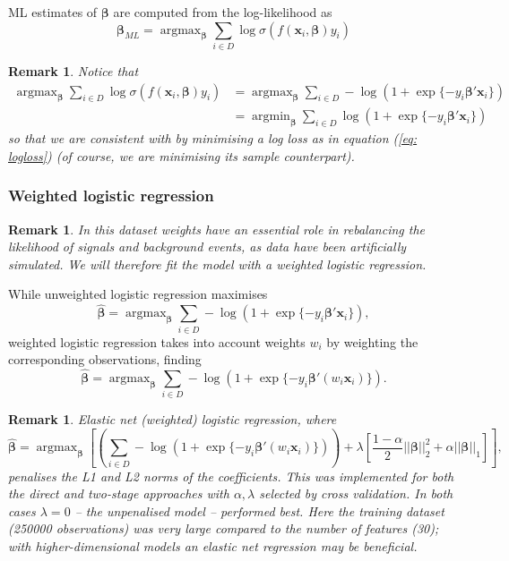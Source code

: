 \documentclass[]{article}
\DeclareMathOperator*{\argmin}{argmin}
\DeclareMathOperator*{\argmax}{argmax}
\newcommand{\x}{\mathbf{x}}
\newcommand{\bbeta}{\boldsymbol \beta}
\newtheorem{remark}[theorem]{Remark}
\begin{document}
ML estimates of $\bbeta$ are computed from the log-likelihood as $$\bbeta_{ML}=\argmax_{\bbeta}\sum_{i\in D}\log\sigma(f(\x_i,\bbeta)y_i)$$

\begin{remark}
Notice that 
\begin{align*}
\argmax_{\bbeta}\sum_{i\in D}\log\sigma(f(\x_i,\bbeta)y_i)&=\argmax_{\bbeta}\sum_{i\in D}-\log(1+\exp\{-y_i\bbeta'\x_i \}) \\
&=\argmin_{\bbeta}\sum_{i\in D}\log(1+\exp\{- y_i\bbeta'\x_i\})
\end{align*} so that we are consistent with \cite{kotlowski2014consistent} by minimising a log loss as in equation (\ref{eq: logloss}) (of course, we are minimising its sample counterpart).
\end{remark}
\subsubsection{Weighted logistic regression}
\begin{remark}
In this dataset weights have an essential role in rebalancing the likelihood of signals and background events, as data have been artificially simulated. We will therefore fit the model with a weighted logistic regression.
\end{remark}

\noindent While unweighted logistic regression maximises 
$$\hat{\bbeta}=\argmax_{\bbeta}\sum_{i\in D}-\log(1+\exp\{-y_i\bbeta'\x_i \}),$$
weighted logistic regression takes into account weights $w_i$ by weighting the corresponding observations, finding
\begin{equation}
\hat{\bbeta}=\argmax_{\bbeta}\sum_{i\in D}-\log(1+\exp\{- y_i\bbeta'(w_i\x_i) \}).
\end{equation}

\begin{remark}
Elastic net (weighted) logistic regression, where
$$\hat{\bbeta}= \argmax_{\bbeta}\left[ \left( \sum_{i\in D}-\log(1+\exp\{- y_i\bbeta'(w_i\x_i) \})\right)  + \lambda\left[ \frac{1-\alpha}{2}||\bbeta||^2_2 + \alpha||\bbeta||_1 \right] \right], 
$$
penalises the L1 and L2 norms of the coefficients. This was implemented for both the direct and two-stage approaches with $\alpha, \lambda$ selected by cross validation. In both cases $\lambda=0$ -- the unpenalised model -- performed best. Here the training dataset (250000 observations) was very large compared to the number of features (30); with higher-dimensional models an elastic net regression may be beneficial.
\end{remark}
\end{document}
